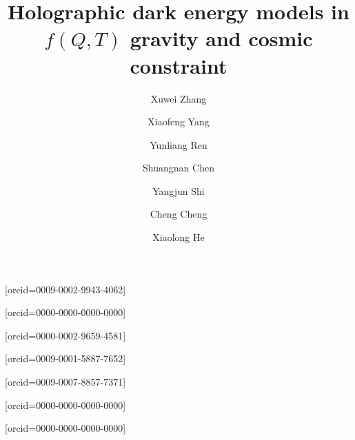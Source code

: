 \documentclass[a4paper,fleqn]{cas-sc}
\begin{document}
\let\WriteBookmarks\relax
\def\floatpagepagefraction{1}
\def\textpagefraction{.001}



\title [mode = title]{Holographic dark energy models in {$f(Q,T)$} gravity and cosmic constraint}  



%

\author[1,2]{Xuwei Zhang}[orcid=0009-0002-9943-4062]




\author[1,2]{Xiaofeng Yang}[orcid=0000-0000-0000-0000]
\cormark[1]

\author[1,3]{Yunliang Ren}[orcid=0000-0002-9659-4581]

\author[1,3]{Shuangnan Chen}[orcid=0009-0001-5887-7652]

\author[1,4]{Yangjun Shi}[orcid=0009-0007-8857-7371]
\author[1,2]{Cheng Cheng}[orcid=0000-0000-0000-0000]
\author[1]{Xiaolong He}[orcid=0000-0000-0000-0000]
\end{document}
